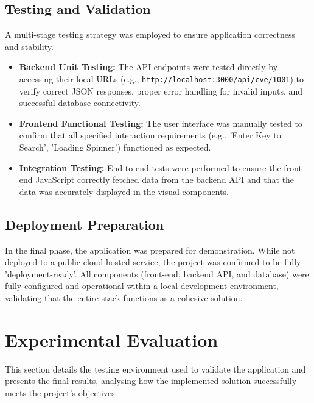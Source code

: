 \documentclass[12pt,a4paper]{article}
\begin{document}
    \subsection{Testing and Validation}
    A multi-stage testing strategy was employed to ensure application correctness and stability.
    \begin{itemize}[label=$\bullet$, leftmargin=*]
        \item \textbf{Backend Unit Testing:} The API endpoints were tested directly by accessing their local URLs (e.g., \texttt{http://localhost:3000/api/cve/1001}) to verify correct JSON responses, proper error handling for invalid inputs, and successful database connectivity.

        \item \textbf{Frontend Functional Testing:} The user interface was manually tested to confirm that all specified interaction requirements (e.g., 'Enter Key to Search', 'Loading Spinner') functioned as expected.

        \item \textbf{Integration Testing:} End-to-end tests were performed to ensure the front-end JavaScript correctly fetched data from the backend API and that the data was accurately displayed in the visual components.
    \end{itemize}
    \subsection{Deployment Preparation}
    In the final phase, the application was prepared for demonstration. While not deployed to a public cloud-hosted service, the project was confirmed to be fully 'deployment-ready'. All components (front-end, backend API, and database) were fully configured and operational within a local development environment, validating that the entire stack functions as a cohesive solution.
    \clearpage
    \section{Experimental Evaluation}
    This section details the testing environment used to validate the application and presents the final results, analysing how the implemented solution successfully meets the project's objectives.
\end{document}
